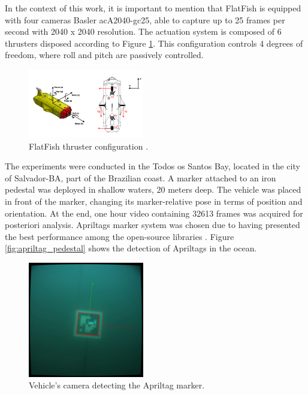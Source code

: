 \documentclass[conference, letterpaper]{IEEEtran}
\begin{document}
In the context of this work, it is important to mention that FlatFish is
equipped with four cameras Basler acA2040-gc25, able to capture up to 25 frames
per second with 2040 x 2040 resolution. The actuation system is composed of 6
thrusters disposed according to Figure \ref{fig:thrusters_configuration}. This
configuration controls 4 degrees of freedom, where roll and pitch are passively
controlled. 

\begin{figure}[!ht]
    \centering
    \includegraphics[width=0.45\textwidth]{./fig/thrust_configuration.png}
    \caption{FlatFish thruster configuration \cite{saback2016}.}
    \label{fig:thrusters_configuration}
\end{figure}

The experiments were conducted in the Todos os Santos Bay, located in the city
of Salvador-BA, part of the Brazilian coast. A marker attached to an iron
pedestal was deployed in shallow waters, 20 meters deep. The vehicle was
placed in front of the marker, changing its marker-relative pose in terms of
position and orientation. At the end, one hour video containing 32613 frames was
acquired for posteriori analysis. Apriltags marker system was chosen due
to having presented the best performance among the open-source libraries
\cite{diego}.  Figure \ref{fig:apriltag_pedestal} shows the detection of
Apriltags in the ocean.

\begin{figure}[!htpb]
	\centering
	\includegraphics[width=0.45\textwidth]{./fig/april_ocean3.png}
    \caption{Vehicle's camera detecting the Apriltag marker.}
    \label{fig:apriltags_ocean}
\end{figure}
\end{document}
